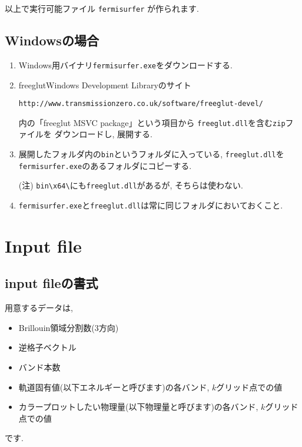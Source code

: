 \documentclass[12pt]{jarticle}
\begin{document}
以上で実行可能ファイル \texttt{fermisurfer} が作られます. 

\subsection{Windowsの場合}

\begin{enumerate}

\item Windows用バイナリ\texttt{fermisurfer.exe}をダウンロードする.

\item freeglutWindows Development Libraryのサイト
\begin{verbatim}
http://www.transmissionzero.co.uk/software/freeglut-devel/
\end{verbatim}
内の「freeglut MSVC package」という項目から
\texttt{freeglut.dll}を含む\texttt{zip}ファイルを
ダウンロードし, 展開する.

\item 展開したフォルダ内の\texttt{bin}というフォルダに入っている,
\texttt{freeglut.dll}を\texttt{fermisurfer.exe}のあるフォルダにコピーする.

(注) \verb|bin\x64\|にも\verb|freeglut.dll|があるが, そちらは使わない.

\item \verb|fermisurfer.exe|と\verb|freeglut.dll|は常に同じフォルダにおいておくこと.

\end{enumerate}

\section{Input file}

\subsection{input fileの書式}

用意するデータは, 
\begin{itemize}
\item Brillouin領域分割数(3方向)
\item 逆格子ベクトル
\item バンド本数
\item 軌道固有値(以下エネルギーと呼びます)の各バンド, $k$グリッド点での値
\item カラープロットしたい物理量(以下物理量と呼びます)の各バンド, $k$グリッド点での値
\end{itemize}
です. 
\end{document}
